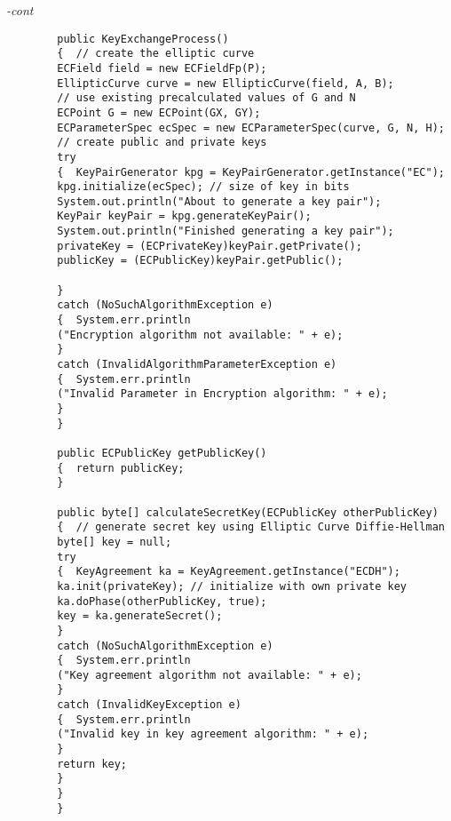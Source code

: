 \begin{figure*}\begin{program}\emph{-cont}\begin{verbatim}
		public KeyExchangeProcess()
		{  // create the elliptic curve
		ECField field = new ECFieldFp(P);
		EllipticCurve curve = new EllipticCurve(field, A, B);
		// use existing precalculated values of G and N
		ECPoint G = new ECPoint(GX, GY);
		ECParameterSpec ecSpec = new ECParameterSpec(curve, G, N, H);
		// create public and private keys
		try
		{  KeyPairGenerator kpg = KeyPairGenerator.getInstance("EC");
		kpg.initialize(ecSpec); // size of key in bits
		System.out.println("About to generate a key pair");
		KeyPair keyPair = kpg.generateKeyPair();
		System.out.println("Finished generating a key pair");
		privateKey = (ECPrivateKey)keyPair.getPrivate();
		publicKey = (ECPublicKey)keyPair.getPublic();
		
		}
		catch (NoSuchAlgorithmException e)
		{  System.err.println
		("Encryption algorithm not available: " + e);
		}
		catch (InvalidAlgorithmParameterException e)
		{  System.err.println
		("Invalid Parameter in Encryption algorithm: " + e);
		}
		}
		
		public ECPublicKey getPublicKey()
		{  return publicKey;
		}
		
		public byte[] calculateSecretKey(ECPublicKey otherPublicKey)
		{  // generate secret key using Elliptic Curve Diffie-Hellman
		byte[] key = null;
		try
		{  KeyAgreement ka = KeyAgreement.getInstance("ECDH");
		ka.init(privateKey); // initialize with own private key
		ka.doPhase(otherPublicKey, true);
		key = ka.generateSecret();
		}
		catch (NoSuchAlgorithmException e)
		{  System.err.println
		("Key agreement algorithm not available: " + e);
		}
		catch (InvalidKeyException e)
		{  System.err.println
		("Invalid key in key agreement algorithm: " + e);
		}
		return key;
		}
		}
		}
		\end{verbatim}\end{program}\end{figure*}
